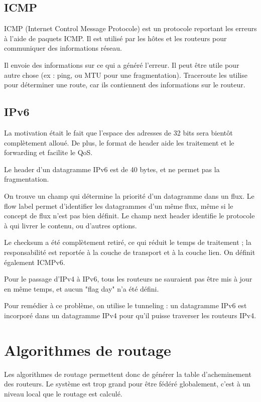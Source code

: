 	
	\subsection{ICMP}
	
	ICMP (Internet Control Message Protocole) est un protocole reportant les erreurs à l'aide de paquets ICMP. Il est utilisé par les hôtes et les routeurs pour communiquer des informations réseau.
	
	Il envoie des informations sur ce qui a généré l'erreur. Il peut être utile pour autre chose (ex : ping, ou MTU pour une fragmentation). Traceroute les utilise pour déterminer une route, car ils contiennent des informations sur le routeur.
	
	\subsection{IPv6}
	
	La motivation était le fait que l'espace des adresses de 32 bits sera bientôt complètement alloué. De plus, le format de header aide les traitement et le forwarding et facilite le QoS.
	
	Le header d'un datagramme IPv6 est de 40 bytes, et ne permet pas la fragmentation.
	
	
	On trouve un champ qui détermine la priorité d'un datagramme dans un flux. Le flow label permet d'identifier les datagrammes d'un même flux, même si le concept de flux n'est pas bien définit. Le champ next header identifie le protocole à qui livrer le contenu, ou d'autres options.
	
	Le checksum a été complètement retiré, ce qui réduit le temps de traitement ; la responsabilité est reportée à la couche de transport et à la couche lien. On définit également ICMPv6.
	
	Pour le passage d'IPv4 à IPv6, tous les routeurs ne sauraient pas être mis à jour en même temps, et aucun "flag day" n'a été défini.
	
	Pour remédier à ce problème, on utilise le tunneling : un datagramme IPv6 est incorporé dans un datagramme IPv4 pour qu'il puisse traverser les routeurs IPv4.
	
	
	
\section{Algorithmes de routage}

Les algorithmes de routage permettent donc de générer la table d'acheminement des routeurs. Le système est trop grand pour être fédéré globalement, c'est à un niveau local que le routage est calculé.

